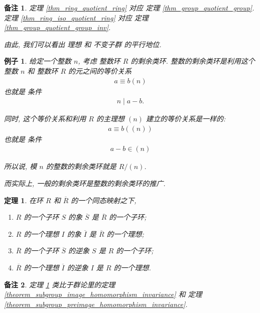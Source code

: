 \documentclass[utf8]{ctexbook}
\newtheorem{theorem}{定理}[section]
\newtheorem{memo}{备注}[section]
\newtheorem{example}{例子}[section]
\begin{document}
\begin{memo}
定理 \ref{thm_ring_quotient_ring} 对应 定理 \ref{thm_group_quotient_group}. 定理 \ref{thm_ring_iso_quotient_ring} 对应 定理 \ref{thm_group_quotient_group_inv}.

由此, 我们可以看出 理想 和 不变子群 的平行地位.
\end{memo}

\begin{example}
给定一个整数 $n$, 考虑 整数环 $R$ 的剩余类环. 整数的剩余类环是利用这个整数 $n$ 和 整数环 $R$ 的元之间的等价关系
\begin{align*}
a \equiv b (n)
\end{align*}
也就是 条件
\begin{align*}
n \mid a - b .
\end{align*}


同时, 这个等价关系和利用 $R$ 的主理想 $(n)$ 建立的等价关系是一样的:
\begin{align*}
a \equiv b ( (n) )
\end{align*}
也就是 条件 
\begin{align*}
a - b \in (n) 
\end{align*}

所以说, 模 $n$ 的整数的剩余类环就是 $R/(n)$.

而实际上, 一般的剩余类环是整数的剩余类环的推广.

\end{example}

\begin{theorem}\label{theorem_subring_image_preimage_homomorphism_invariance}
在环 $R$ 和 $\overline{R}$ 的一个同态映射之下,
\begin{enumerate}
\item{$R$ 的一个子环 $S$ 的象 $\overline{S}$ 是 $\overline{R}$ 的一个子环; }
\item{$R$ 的一个理想 $I$ 的象 $\overline{I}$ 是 $\overline{R}$ 的一个理想;}
\item{$\overline{R}$ 的一个子环 $\overline{S}$ 的逆象 $S$ 是 $R$ 的一个子环; }
\item{$\overline{R}$ 的一个理想 $\overline{I}$ 的逆象 $I$ 是 $R$ 的一个理想. }
\end{enumerate}
\end{theorem}

\begin{memo}
定理 \ref{theorem_subring_image_preimage_homomorphism_invariance} 类比于群论里的定理 \ref{theorem_subgroup_image_homomorphism_invariance} 和 定理 \ref{theorem_subgroup_preimage_homomorphism_invariance}.
\end{memo}
\end{document}
